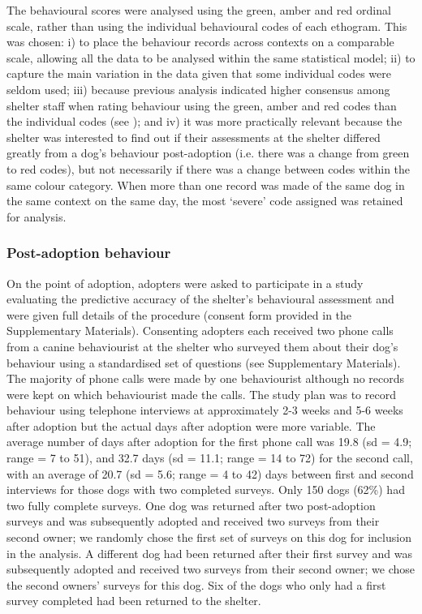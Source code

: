 \documentclass[12pt]{article}
\begin{document}
The behavioural scores were analysed using the green, amber and red ordinal scale, rather than using the individual behavioural codes of each ethogram. This was chosen: i) to place the behaviour records across contexts on a comparable scale, allowing all the data to be analysed within the same statistical model; ii) to capture the main variation in the data given that some individual codes were seldom used; iii) because previous analysis indicated higher consensus among shelter staff when rating behaviour using the green, amber and red codes than the individual codes (see \cite{goold2017modelling}); and iv) it was more practically relevant because the shelter was interested to find out if their assessments at the shelter differed greatly from a dog's behaviour post-adoption (i.e. there was a change from green to red codes), but not necessarily if there was a change between codes within the same colour category. When more than one record was made of the same dog in the same context on the same day, the most `severe' code assigned was retained for analysis.

\subsubsection{Post-adoption behaviour}
On the point of adoption, adopters were asked to participate in a study evaluating the predictive accuracy of the shelter's behavioural assessment and were given full details of the procedure (consent form provided in the Supplementary Materials). Consenting adopters each received two phone calls from a canine behaviourist at the shelter who surveyed them about their dog's behaviour using a standardised set of questions (see Supplementary Materials). The majority of phone calls were made by one behaviourist although no records were kept on which behaviourist made the calls. The study plan was to record behaviour using telephone interviews at approximately 2-3 weeks and 5-6 weeks after adoption but the actual days after adoption were more variable. The average number of days after adoption for the first phone call was 19.8 (sd = 4.9; range = 7 to 51), and 32.7 days (sd = 11.1; range = 14 to 72) for the second call, with an average of 20.7 (sd = 5.6; range = 4 to 42) days between first and second interviews for those dogs with two completed surveys. Only 150 dogs (62\%) had two fully complete surveys. One dog was returned after two post-adoption surveys and was subsequently adopted and received two surveys from their second owner; we randomly chose the first set of surveys on this dog for inclusion in the analysis. A different dog had been returned after their first survey and was subsequently adopted and received two surveys from their second owner; we chose the second owners' surveys for this dog. Six of the dogs who only had a first survey completed had been returned to the shelter.
\end{document}
